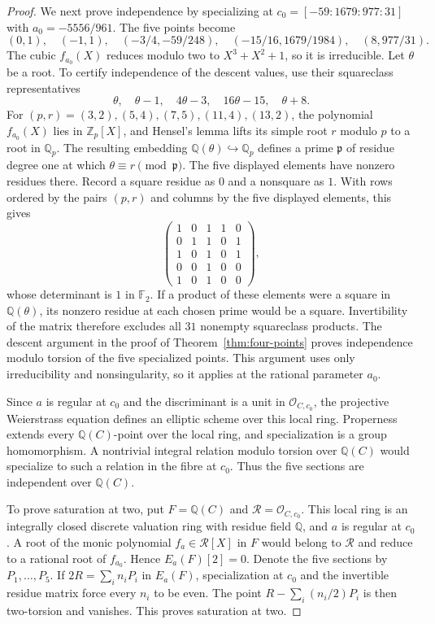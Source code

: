 \documentclass[11pt,leqno,oneside,letterpaper]{amsart}
\theoremstyle{remark}
\numberwithin{equation}{section}
\newcommand{\Q}{\mathbb Q}
\newcommand{\Z}{\mathbb Z}
\newcommand{\F}{\mathbb F}
\begin{document}
\begin{proof}
  We next prove independence by specializing at $c_0=[-59:1679:977:31]$ with $a_0=-5556/961$. The five points become
  \[
    (0,1),\quad(-1,1),\quad(-3/4,-59/248),\quad
    (-15/16,1679/1984),\quad(8,977/31).
  \]
  The cubic $f_{a_0}(X)$ reduces modulo two to $X^3+X^2+1$, so it is irreducible. Let $\theta$ be a root. To certify independence of the descent values, use their squareclass representatives
  \[
    \theta,\quad\theta-1,\quad4\theta-3,\quad16\theta-15,\quad\theta+8.
  \]
  For $(p,r)=(3,2),(5,4),(7,5),(11,4),(13,2)$, the polynomial $f_{a_0}(X)$ lies in $\Z_p[X]$, and Hensel's lemma lifts its simple root $r$ modulo $p$ to a root in $\Q_p$. The resulting embedding $\Q(\theta)\hookrightarrow\Q_p$ defines a prime $\mathfrak p$ of residue degree one at which $\theta\equiv r\pmod{\mathfrak p}$. The five displayed elements have nonzero residues there. Record a square residue as $0$ and a nonsquare as $1$. With rows ordered by the pairs $(p,r)$ and columns by the five displayed elements, this gives
  \begin{equation}\label{eq:rank-five-residue-matrix}
    \begin{pmatrix}
      1 & 0 & 1 & 1 & 0 \\
      0 & 1 & 1 & 0 & 1 \\
      1 & 0 & 1 & 0 & 1 \\
      0 & 0 & 1 & 0 & 0 \\
      1 & 0 & 1 & 0 & 0
    \end{pmatrix},
  \end{equation}
  whose determinant is $1$ in $\F_2$. If a product of these elements were a square in $\Q(\theta)$, its nonzero residue at each chosen prime would be a square. Invertibility of the matrix therefore excludes all $31$ nonempty squareclass products. The descent argument in the proof of Theorem~\ref{thm:four-points} proves independence modulo torsion of the five specialized points. This argument uses only irreducibility and nonsingularity, so it applies at the rational parameter $a_0$.

  Since $a$ is regular at $c_0$ and the discriminant is a unit in $\mathcal O_{C,c_0}$, the projective Weierstrass equation defines an elliptic scheme over this local ring. Properness extends every $\Q(C)$-point over the local ring, and specialization is a group homomorphism. A nontrivial integral relation modulo torsion over $\Q(C)$ would specialize to such a relation in the fibre at $c_0$. Thus the five sections are independent over $\Q(C)$.

  To prove saturation at two, put $F=\Q(C)$ and $\mathcal R=\mathcal O_{C,c_0}$. This local ring is an integrally closed discrete valuation ring with residue field $\Q$, and $a$ is regular at $c_0$. A root of the monic polynomial $f_a\in\mathcal R[X]$ in $F$ would belong to $\mathcal R$ and reduce to a rational root of $f_{a_0}$. Hence $E_a(F)[2]=0$. Denote the five sections by $P_1,\ldots,P_5$. If $2R=\sum_i n_iP_i$ in $E_a(F)$, specialization at $c_0$ and the invertible residue matrix force every $n_i$ to be even. The point $R-\sum_i(n_i/2)P_i$ is then two-torsion and vanishes. This proves saturation at two.


\end{proof}
\end{document}
